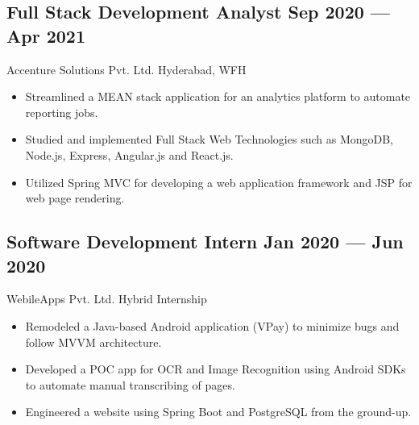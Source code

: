 \documentclass[a4,10pt]{article}
\newcommand{\subtext}[1]{
#1\par\vspace{-0.2cm}}
\newenvironment{zitemize}{
\begin{itemize}\itemsep0pt \parskip0pt \parsep1pt}
{\end{itemize}\vspace{-0.5cm}}
\begin{document}
        

\subsection*{Full Stack Development Analyst \hfill Sep 2020 --- Apr 2021} 
\subtext{Accenture Solutions Pvt. Ltd. \hfill Hyderabad, WFH} 
    \begin{zitemize}
        \item Streamlined a MEAN stack application for an analytics platform to automate reporting jobs.
        \item Studied and implemented Full Stack Web Technologies such as MongoDB, Node.js, Express, Angular.js and React.js.
        \item Utilized Spring MVC for developing a web application framework and JSP for web page rendering.
    \end{zitemize}
    
\subsection*{Software Development Intern \hfill Jan 2020 --- Jun 2020} 
\subtext{WebileApps Pvt. Ltd. \hfill Hybrid Internship} 
    \begin{zitemize}
        \item Remodeled a Java-based Android application (VPay) to minimize bugs and follow MVVM architecture.
        \item Developed a POC app for OCR and Image Recognition using Android SDKs to automate manual transcribing of pages.
        \item Engineered a website using Spring Boot and PostgreSQL from the ground-up.
    \end{zitemize}
\end{document}
